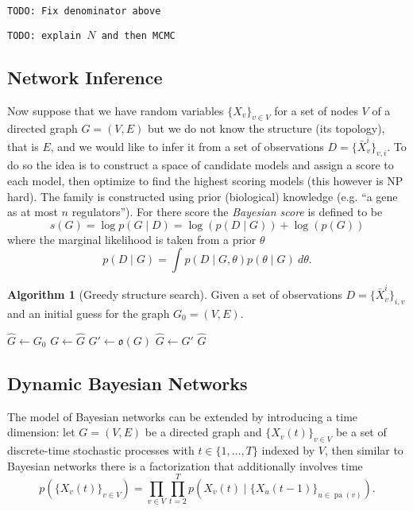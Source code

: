 \documentclass[a4paper]{article}
\newcommand{\todo}[1]{\texttt{TODO: #1}}
\newcommand{\given}{\mid}
\DeclareMathOperator{\pa}{pa} %
\theoremstyle{plain}
\theoremstyle{definition}
\newtheorem{alg}{Algorithm}[section]
\theoremstyle{remark}
\begin{document}
\todo{Fix denominator above}

\todo{explain $N$ and then MCMC}

\subsection{Network Inference}

Now suppose that we have random variables $\{X_v\}_{v \in V}$ for a set of
nodes $V$ of a directed graph $G = (V,E)$ but we do not know the structure
(its topology), that is $E$, and we would like to infer it from a set of
observations $D = \{\bar{X}_v^i\}_{v,i}$. To do so the idea is to construct a
space of candidate models and assign a score to each model, then optimize to
find the highest scoring models (this however is NP hard). The family is
constructed using prior (biological) knowledge (e.g. ``a gene as at most $n$
regulators''). For there score the \emph{Bayesian score} is defined to be
\[
  s(G) = \log p(G \given D) = \log(p(D \given G)) + \log(p(G))
\]
where the marginal likelihood is taken from a prior $\theta$
\[
  p(D \given G) = \int p(D \given G, \theta) p(\theta \given G) ~ d\theta.
\]

\begin{alg}[Greedy structure search]
  Given a set of observations $D = \{\bar{X}_v^i\}_{i,v}$ and an initial guess
  for the graph $G_0 = (V,E)$.
  \begin{algorithmic}
      \State $\hat{G} \gets G_0$
      \Repeat
        \State $G \gets \hat{G}$
        \State {}
          \State $G' \gets \mathfrak{o}(G)$
              \State $\hat{G} \gets G'$
            \EndIf
          \EndIf
        \EndFor
      \State \Return $\hat{G}$
    \EndFunction
  \end{algorithmic}
\end{alg}

\subsection{Dynamic Bayesian Networks}

The model of Bayesian networks can be extended by introducing a time
dimension: let $G = (V,E)$ be a directed graph and $\{X_v(t)\}_{v\in V}$ be a
set of discrete-time stochastic processes with $t \in \{1,\ldots, T\}$ indexed
by $V$, then similar to Bayesian networks there is a factorization that
additionally involves time
\[
  p(\{X_v(t)\}_{v \in V})
    = \prod_{v \in V} \prod_{t=2}^T p(X_v(t) \given 
      \{X_u(t-1)\}_{u \in \pa(v)}).
\]
\end{document}
